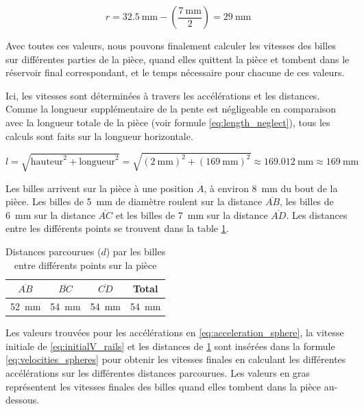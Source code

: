 \[r = \SI{32.5}{\mm} - \left(\frac{\SI{7}{\mm}}{2}\right) = \SI{29}{\mm}\]

Avec toutes ces valeurs, nous pouvons finalement calculer les vitesses des billes sur différentes parties de la pièce, quand elles quittent la pièce et tombent dans le réservoir final correspondant, et le temps nécessaire pour chacune de ces valeurs.

Ici, les vitesses sont déterminées à travers les accélérations et les distances. Comme la longueur supplémentaire de la pente est négligeable en comparaison avec la longueur totale de la pièce (voir formule \ref{eq:length_neglect}), tous les calculs sont faits sur la longueur horizontale.

\begin{equation}
    l = \sqrt{\text{hauteur}^2 + \text{longueur}^2} = \sqrt{(\SI{2}{\mm})^2 + (\SI{169}{\mm})^2} \approx \SI{169.012}{\mm} \approx \SI{169}{\mm}
    \label{eq:length_neglect}
\end{equation}

Les billes arrivent sur la pièce à une position $A$, à environ \SI{8}{\mm} du bout de la pièce. Les billes de \SI{5}{\mm} de diamètre roulent sur la distance $\overline{AB}$, les billes de \SI{6}{\mm} sur la distance $\overline{AC}$ et les billes de \SI{7}{\mm} sur la distance $\overline{AD}$. Les distances entre les différents points se trouvent dans la table \ref{tab:sphere_rolling_distance}.

\begin{table}[htbp]
    \centering
    \begin{tabular}{|c|c|c|c|}
        \hline
        $\overline{AB}$ & $\overline{BC}$ & $\overline{CD}$ & Total \\
        \hline
        \SI{52}{\mm} & \SI{54}{\mm} & \SI{54}{\mm} & \SI{54}{\mm} \\
        \hline
    \end{tabular}
    \caption{Distances parcourues ($d$) par les billes entre différents points sur la pièce}
    \label{tab:sphere_rolling_distance}
\end{table}

Les valeurs trouvées pour les accélérations en \ref{eq:acceleration_sphere}, la vitesse initiale de \ref{eq:initialV_rails} et les distances de \ref{tab:sphere_rolling_distance} sont insérées dans la formule \ref{eq:velocities_spheres} pour obtenir les vitesses finales en calculant les différentes accélérations sur les différentes distances parcourues. Les valeurs en gras représentent les vitesses finales des billes quand elles tombent dans la pièce au-dessous.

